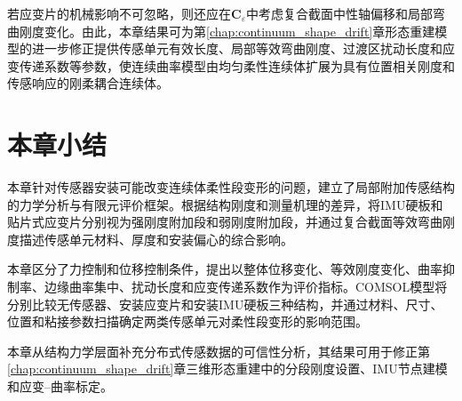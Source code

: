 若应变片的机械影响不可忽略，则还应在$\bm C_{\varepsilon}$中考虑复合截面中性轴偏移和局部弯曲刚度变化。由此，本章结果可为第\ref{chap:continuum_shape_drift}章形态重建模型的进一步修正提供传感单元有效长度、局部等效弯曲刚度、过渡区扰动长度和应变传递系数等参数，使连续曲率模型由均匀柔性连续体扩展为具有位置相关刚度和传感响应的刚柔耦合连续体。


\section{本章小结}
\label{sec:sensor_influence_summary}

本章针对传感器安装可能改变连续体柔性段变形的问题，建立了局部附加传感结构的力学分析与有限元评价框架。根据结构刚度和测量机理的差异，将IMU硬板和贴片式应变片分别视为强刚度附加段和弱刚度附加段，并通过复合截面等效弯曲刚度描述传感单元材料、厚度和安装偏心的综合影响。

本章区分了力控制和位移控制条件，提出以整体位移变化、等效刚度变化、曲率抑制率、边缘曲率集中、扰动长度和应变传递系数作为评价指标。COMSOL模型将分别比较无传感器、安装应变片和安装IMU硬板三种结构，并通过材料、尺寸、位置和粘接参数扫描确定两类传感单元对柔性段变形的影响范围。


本章从结构力学层面补充分布式传感数据的可信性分析，其结果可用于修正第\ref{chap:continuum_shape_drift}章三维形态重建中的分段刚度设置、IMU节点建模和应变--曲率标定。
